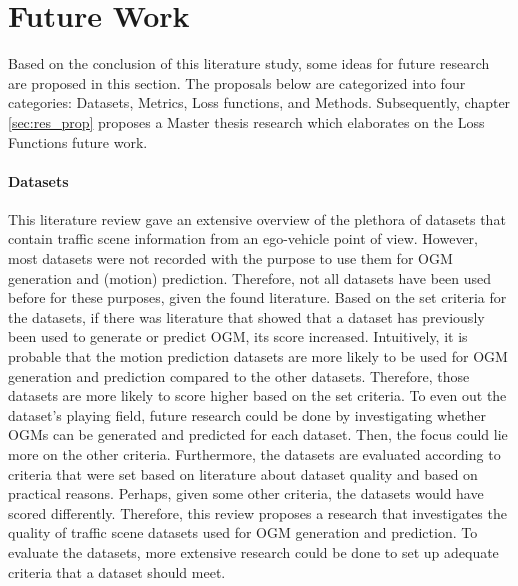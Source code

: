 \section{Future Work} \label{sec:future}
Based on the conclusion of this literature study, some ideas for future research are proposed in this section. The proposals below are categorized into four categories: Datasets, Metrics, Loss functions, and Methods. Subsequently, chapter \ref{sec:res_prop} proposes a Master thesis research which elaborates on the Loss Functions future work.

\paragraph{Datasets}
This literature review gave an extensive overview of the plethora of datasets that contain traffic scene information from an ego-vehicle point of view. However, most datasets were not recorded with the purpose to use them for \gls{OGM} generation and (motion) prediction. Therefore, not all datasets have been used before for these purposes, given the found literature. Based on the set criteria for the datasets, if there was literature that showed that a dataset has previously been used to generate or predict \gls{OGM}, its score increased. Intuitively, it is probable that the motion prediction datasets are more likely to be used for \gls{OGM} generation and prediction compared to the other datasets. Therefore, those datasets are more likely to score higher based on the set criteria. To even out the dataset's playing field, future research could be done by investigating whether \glspl{OGM} can be generated and predicted for each dataset. Then, the focus could lie more on the other criteria. 
Furthermore, the datasets are evaluated according to criteria that were set based on literature about dataset quality and based on practical reasons. Perhaps, given some other criteria, the datasets would have scored differently. Therefore, this review proposes a research that investigates the quality of traffic scene datasets used for \gls{OGM} generation and prediction. To evaluate the datasets, more extensive research could be done to set up adequate criteria that a dataset should meet. \\

